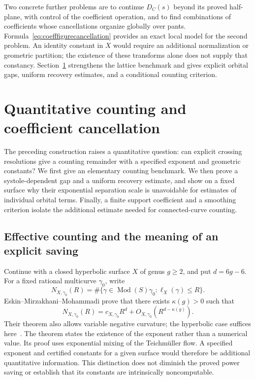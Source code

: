 \documentclass[11pt,a4paper]{article}
\numberwithin{equation}{section}
\theoremstyle{definition}
\theoremstyle{remark}
\begin{document}
Two concrete further problems are to continue $D_C(s)$ beyond its
proved half-plane, with control of the coefficient operation, and
to find combinations of coefficients whose cancellations organize
globally over pants. Formula~\eqref{eq:coefffigurecancellation}
provides an exact local model for the second problem. An identity
constant in $X$ would require an additional normalization or
geometric partition; the existence of these transforms alone does
not supply that constancy. Section~\ref{sec:quantitativecounting}
strengthens the lattice benchmark and gives explicit orbital gaps,
uniform recovery estimates, and a conditional counting criterion.


\clearpage
\section{Quantitative counting and coefficient cancellation}
\label{sec:quantitativecounting}

The preceding construction raises a quantitative question: can explicit
crossing resolutions give a counting remainder with a specified exponent
and geometric constants? We first give an elementary counting benchmark.
We then prove a systole-dependent gap and a uniform recovery estimate,
and show on a fixed surface why their exponential separation scale is
unavoidable for estimates of individual orbital terms. Finally, a finite
support coefficient and a smoothing criterion isolate the additional
estimate needed for connected-curve counting.

\subsection{Effective counting and the meaning of an explicit saving}
\label{subsec:countknown}

Continue with a closed hyperbolic surface $X$ of genus $g\geq2$, and
put $d=6g-6$.  For a fixed rational multicurve $\gamma_0$, write
\[
 N_{X,\gamma_0}(R)=
 \#\{\gamma\in\operatorname{Mod}(S)\gamma_0:
                         \ell_X(\gamma)\leq R\}.
\]
Eskin--Mirzakhani--Mohammadi prove that there exists
$\kappa(g)>0$ such that
\begin{equation}
 N_{X,\gamma_0}(R)
 =c_{X,\gamma_0}R^d
   +O_{X,\gamma_0}(R^{d-\kappa(g)}).
 \label{eq:countEMM}
\end{equation}
Their theorem also allows variable negative curvature; the hyperbolic
case suffices here~\cite[Theorem 1.1]{EMMEffective}.  The theorem
states the existence of the exponent rather than a numerical value.
Its proof uses exponential mixing of the Teichm\"uller flow.  A
specified exponent and certified constants for a given surface would
therefore be additional quantitative information.  This distinction
does not diminish the proved power saving or establish that its
constants are intrinsically noncomputable.
\end{document}
